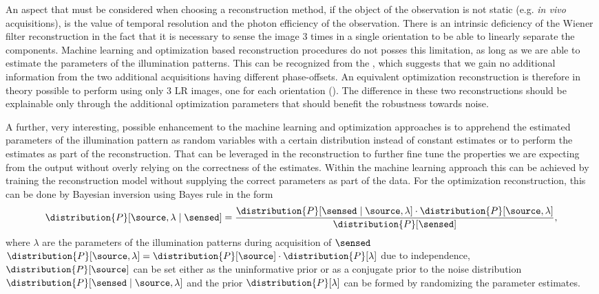 An aspect that must be considered when choosing a reconstruction method, if the object of the observation is not static 
    (e.g. \emph{in vivo} acquisitions), is the value of temporal resolution and the photon efficiency of the 
    observation.
There is an intrinsic deficiency of the Wiener filter reconstruction in the fact that it is necessary to sense the image
    \(3\) times in a single orientation to be able to linearly separate the components.
Machine learning and optimization based reconstruction procedures do not posses this limitation, as long as we are able 
    to estimate the parameters of the illumination patterns.
This can be recognized from the , which suggests that we gain no additional information from the two
    additional acquisitions having different phase-offsets.
An equivalent optimization reconstruction is therefore in theory possible to perform using only \(3\) \ac{LR} images, 
    one for each orientation ().
The difference in these two reconstructions should be explainable only through the additional optimization parameters
    that should benefit the robustness towards noise.

\begin{marginfigure}[*-18]
    \caption{Comparison of optimization reconstruction performed from 3 and 9 \ac{LR} images. }
\end{marginfigure}

A further, very interesting, possible enhancement to the machine learning and optimization approaches is to apprehend
    the estimated parameters of the illumination pattern as random variables with a certain distribution instead of 
    constant estimates or to perform the estimates as part of the reconstruction.
That can be leveraged in the reconstruction to further fine tune the properties we are expecting from the output
    without overly relying on the correctness of the estimates.
Within the machine learning approach this can be achieved by training the reconstruction model without supplying the 
    correct parameters as part of the data.
For the optimization reconstruction, this can be done by Bayesian inversion using Bayes rule in the
    form
    \begin{equation*}
        \distribution{P}[\source, \lambda \mid \sensed] = \frac{\distribution{P}[\sensed \mid \source,
        \lambda] \cdot \distribution{P}[\source, \lambda]}{\distribution{P}[\sensed]},
    \end{equation*}
    where \(\lambda\) are the parameters of the illumination patterns during acquisition of \(\sensed\)
    \(\distribution{P}[\source , \lambda] = \distribution{P}[\source] \cdot \distribution{P}[\lambda]\) due to
    independence, \(\distribution{P}[\source]\) can be set either as the uninformative prior or as a conjugate prior
    to the noise distribution \(\distribution{P}[\sensed \mid \source, \lambda]\) and the prior 
    \(\distribution{P}[\lambda]\) can be formed by randomizing the parameter estimates.

